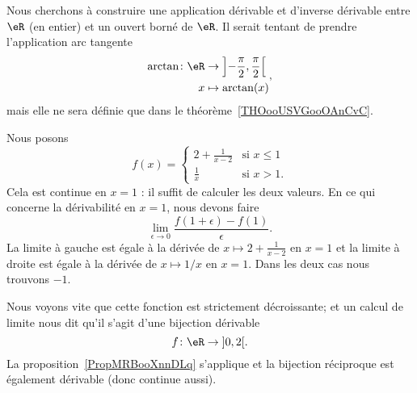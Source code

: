 \begin{example}      \label{EXooGKPNooZtmJen}
    Nous cherchons à construire une application dérivable et d'inverse dérivable entre \( \eR\) (en entier) et un ouvert borné de \( \eR\). Il serait tentant de prendre l'application arc tangente
    \begin{equation}
        \begin{aligned}
        \arctan\colon \eR&\to \left] -\frac{ \pi }{2} , \frac{ \pi }{2} \right[ \\
            x&\mapsto \arctan(x)
        \end{aligned},
    \end{equation}
    mais elle ne sera définie que dans le théorème~\ref{THOooUSVGooOAnCvC}.

    Nous posons
    \begin{equation}
        f(x)=\begin{cases}
            2+\frac{1}{ x-2 }    &   \text{si } x\leq 1\\
            \frac{1}{ x }    &    \text{si } x>1.
        \end{cases}
    \end{equation}
    Cela est continue en \( x=1\) : il suffit de calculer les deux valeurs. En ce qui concerne la dérivabilité en \( x=1\), nous devons faire
    \begin{equation}
        \lim_{\epsilon\to 0}\frac{ f(1+\epsilon)-f(1) }{ \epsilon }.
    \end{equation}
    La limite à gauche est égale à la dérivée de \( x\mapsto 2+\frac{ 1 }{ x-2 }\) en \( x=1\) et la limite à droite est égale à la dérivée de \( x\mapsto 1/x\) en \( x=1\). Dans les deux cas nous trouvons \( -1\).

    \begin{center}
        
    \end{center}

    Nous voyons vite que cette fonction est strictement décroissante; et un calcul de limite nous dit qu'il s'agit d'une bijection dérivable
    \begin{equation}
        f\colon \eR\to \mathopen] 0 , 2 \mathclose[.
    \end{equation}
    La proposition~\ref{PropMRBooXnnDLq} s'applique et la bijection réciproque est également dérivable (donc continue aussi).
\end{example}

